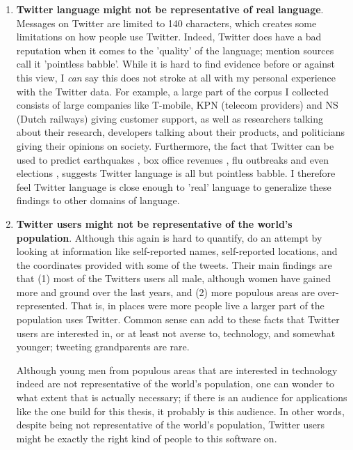 \documentclass[12pt]{article}
\begin{document}
\begin{enumerate}

\item \textbf{Twitter language might not be representative of real language}. Messages on Twitter are limited to 140 characters, which creates some limitations on how people use Twitter. Indeed, Twitter does have a bad reputation when it comes to the 'quality' of the language;  mention sources call it 'pointless babble'. While it is hard to find evidence before or against this view, I \emph{can} say this does not stroke at all with my personal experience with the Twitter data. For example, a large part of the corpus I collected consists of large companies like T-mobile, KPN (telecom providers) and NS (Dutch railways) giving customer support, as well as researchers talking about their research, developers talking about their products, and politicians giving their opinions on society. Furthermore, the fact that Twitter can be used to predict earthquakes , box office revenues , flu outbreaks  and even elections , suggests Twitter language is all but pointless babble. I therefore feel Twitter language is close enough to 'real' language to generalize these findings to other domains of language.

\item \textbf{Twitter users might not be representative of the world's population}. Although this again is hard to quantify,  do an attempt by looking at information like self-reported names, self-reported locations, and the coordinates provided with some of the tweets. Their main findings are that (1) most of the Twitters users all male, although women have gained more and ground over the last years, and (2) more populous areas are over-represented. That is, in places were more people live a larger part of the population uses Twitter. Common sense can add to these facts that Twitter users are interested in, or at least not averse to, technology, and somewhat younger; tweeting grandparents are rare. 

Although young men from populous areas that are interested in technology indeed are not representative of the world's population, one can wonder to what extent that is actually necessary; if there is an audience for applications like the one build for this thesis, it probably is this audience. In other words, despite being not representative of the world's population, Twitter users might be exactly the right kind of people to this software on.

\end{enumerate}
\end{document}
